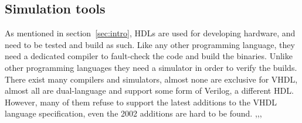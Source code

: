 \documentclass[11pt,british]{article}
\begin{document}


\subsection{Simulation tools}
As mentioned in section~\ref{sec:intro}, \gls{HDL}s are used for developing hardware, and need to be tested and build as such. Like any other programming language, they need a dedicated compiler to fault-check the code and build the binaries. Unlike other programming languages they need a simulator in order to verify the builds. There exist many compilers and simulators, almost none are exclusive for \gls{VHDL}, almost all are dual-language and support some form of Verilog, a different HDL. However, many of them refuse to support the latest additions to the VHDL language specification, even the 2002 additions are hard to be found. \cite{ActiveHDL},\cite{Cadence},\cite{ISE},\cite{Quartus}
\end{document}
